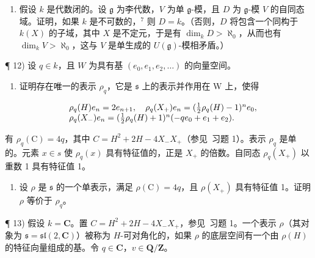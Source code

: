\begin{enumerate}
\def\labelenumi{\arabic{enumi})}
\setcounter{enumi}{10}
\tightlist
\item
  假设 \(k\) 是代数闭的。设 \(\mathfrak{g}\) 为李代数，\(V\) 为单 \(\mathfrak{g}\)-模，且 \(D\) 为 \(\mathfrak{g}\)-模 \(V\) 的自同态域。证明，如果 \(k\) 是不可数的，\(^7\) 则 \(D = k\)。（否则，\(D\) 将包含一个同构于 \(k(X)\) 的子域，其中 \(X\) 是不定元，于是有 \(\dim_k D > \aleph_0\)，从而也有 \(\dim_k V > \aleph_0\)，这与 \(V\) 是单生成的 \(U(\mathfrak{g})\)-模相矛盾。）
\end{enumerate}


¶ 12) 设 \(q \in k\)，且 \(W\) 为具有基 \((e_0, e_1, e_2, \ldots)\) 的向量空间。

\begin{enumerate}
\def\labelenumi{\alph{enumi})}
\tightlist
\item
  证明存在唯一的表示 \(\rho_{q}\)，它是 \(\mathfrak{s}\) 上的表示并作用在 W 上，使得
\end{enumerate}

\[
\begin{array}{r l} & {\rho_ {q} (H) e _ {n} = 2 e _ {n + 1}, \quad \rho_ {q} (X _ {+}) e _ {n} = (\frac {1}{2} \rho_ {q} (H) - 1) ^ {n} e _ {0},} \\ & {\rho_ {q} (X _ {-}) e _ {n} = (\frac {1}{2} \rho_ {q} (H) + 1) ^ {n} (- q e _ {0} + e _ {1} + e _ {2}).} \end{array}
\]

有 \(\rho_{q}(\mathrm{C}) = 4q\)，其中 \(C = H^{2} + 2H - 4X_{-}X_{+}\)（参见~习题 1）。表示 \(\rho_{q}\) 是单的。元素 \(x \in s\) 使 \(\rho_{q}(x)\) 具有特征值的，正是 \(X_{+}\) 的倍数。自同态 \(\rho_{q}(X_{+})\) 以重数 1 具有特征值 1。

\begin{enumerate}
\def\labelenumi{\alph{enumi})}
\setcounter{enumi}{1}
\tightlist
\item
  设 \(\rho\) 是 \(\mathfrak{s}\) 的一个单表示，满足 \(\rho(\mathrm{C}) = 4q\)，且 \(\rho(X_{+})\) 具有特征值 1。证明 \(\rho\) 等价于 \(\rho_q\)。
\end{enumerate}

¶ 13) 假设 \(k = \mathbf{C}\)。置 \(C = H^2 + 2H - 4X_-X_+\)，参见~习题 1。一个表示 \(\rho\)（其对象为 \(\mathfrak{s} = \mathfrak{sl}(2, \mathbf{C})\)）被称为 \(H\)-可对角化的，如果 \(\rho\) 的底层空间有一个由 \(\rho(H)\) 的特征向量组成的基。令 \(q \in \mathbf{C}\)，\(v \in \mathbf{Q}/\mathbf{Z}\)。

